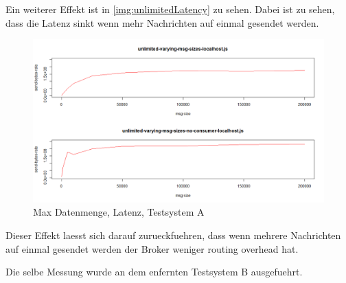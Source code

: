 Ein weiterer Effekt ist in \autoref{img:unlimitedLatency} zu sehen. Dabei ist zu sehen, dass die Latenz sinkt wenn mehr Nachrichten auf einmal gesendet werden.
\begin{figure}
\center
  \includegraphics[width=1\textwidth]{images/max-byte-throughput-A.png}
  \caption{Max Datenmenge, Latenz, Testsystem A}
  \label{img:unlimitedLatency}
\end{figure}
Dieser Effekt laesst sich darauf zurueckfuehren, dass wenn mehrere Nachrichten auf einmal gesendet werden der Broker weniger routing overhead hat.

Die selbe Messung wurde an dem enfernten Testsystem B ausgefuehrt. %







